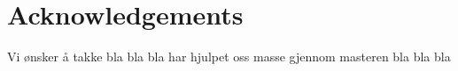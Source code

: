 \section*{Acknowledgements}
\label{sec:acknowledgements}

Vi ønsker å takke 
bla bla bla 
har hjulpet oss masse gjennom masteren bla bla bla
